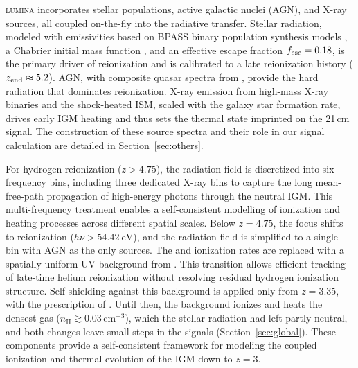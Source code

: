 \documentclass[apj,twocolumn, appendixfloats, twocolappendix, numberedappendix, tighten]{openjournal}
\DeclareRobustCommand{\lumina}{\mbox{\textsc{lumina}}\xspace}
\begin{document}
\lumina incorporates stellar populations, active galactic nuclei (AGN), and X-ray sources, all coupled on-the-fly into the radiative transfer. Stellar radiation, modeled with emissivities based on BPASS binary population synthesis models \citep[v2.2.1;][]{BPASS2017, Stanway2018}, a Chabrier initial mass function \citep{Chabrier2003}, and an effective escape fraction $f_{\rm esc}=0.18$, is the primary driver of  reionization and is calibrated to a late reionization history ($z_{\rm end}\approx5.2$). AGN, with composite quasar spectra from \citet{Shen2020}, provide the hard radiation that dominates  reionization. X-ray emission from high-mass X-ray binaries and the shock-heated ISM, scaled with the galaxy star formation rate, drives early IGM heating and thus sets the thermal state imprinted on the 21\,cm signal. The construction of these source spectra and their role in our signal calculation are detailed in Section~\ref{sec:others}.

For hydrogen reionization ($z > 4.75$), the radiation field is discretized into six frequency bins, including three dedicated X-ray bins to capture the long mean-free-path propagation of high-energy photons through the neutral IGM. This multi-frequency treatment enables a self-consistent modelling of ionization and heating processes across different spatial scales. Below $z = 4.75$, the focus shifts to  reionization ($h\nu>54.42~\mathrm{eV}$), and the radiation field is simplified to a single bin with AGN as the only sources. The  and  ionization rates are replaced with a spatially uniform UV background from \citet{FaucherGiguere2009}. This transition allows efficient tracking of late-time helium reionization without resolving residual hydrogen ionization structure. Self-shielding against this background is applied only from $z = 3.35$, with the prescription of \citet{Rahmati2013} \citep{Zier2026}. Until then, the background ionizes and heats the densest gas ($n_\mathrm{H} \gtrsim 0.03\,\mathrm{cm^{-3}}$), which the stellar radiation had left partly neutral, and both changes leave small steps in the signals (Section~\ref{sec:global}). These components provide a self-consistent framework for modeling the coupled ionization and thermal evolution of the IGM down to $z=3$.

\end{document}
